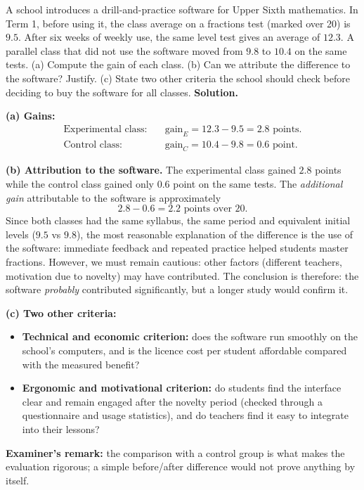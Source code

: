 \documentclass[11pt]{article}
\begin{document}
\begin{exoresolu}
A school introduces a drill-and-practice software for Upper Sixth mathematics. In Term 1, before using it, the class average on a fractions test (marked over 20) is $9.5$. After six weeks of weekly use, the same level test gives an average of $12.3$. A parallel class that did not use the software moved from $9.8$ to $10.4$ on the same tests. (a) Compute the gain of each class. (b) Can we attribute the difference to the software? Justify. (c) State two other criteria the school should check before deciding to buy the software for all classes.
\tcblower
\textbf{Solution.}

\textbf{(a) Gains:}
\begin{align*}
\text{Experimental class:}\quad & \text{gain}_E = 12.3 - 9.5 = 2.8 \text{ points.}\\
\text{Control class:}\quad & \text{gain}_C = 10.4 - 9.8 = 0.6 \text{ point.}
\end{align*}

\textbf{(b) Attribution to the software.} The experimental class gained $2.8$ points while the control class gained only $0.6$ point on the same tests. The \emph{additional gain} attributable to the software is approximately
\[ 2.8 - 0.6 = 2.2 \text{ points over 20.} \]
Since both classes had the same syllabus, the same period and equivalent initial levels ($9.5$ vs $9.8$), the most reasonable explanation of the difference is the use of the software: immediate feedback and repeated practice helped students master fractions. However, we must remain cautious: other factors (different teachers, motivation due to novelty) may have contributed. The conclusion is therefore: the software \emph{probably} contributed significantly, but a longer study would confirm it.

\textbf{(c) Two other criteria:}
\begin{itemize}
\item \textbf{Technical and economic criterion:} does the software run smoothly on the school's computers, and is the licence cost per student affordable compared with the measured benefit?
\item \textbf{Ergonomic and motivational criterion:} do students find the interface clear and remain engaged after the novelty period (checked through a questionnaire and usage statistics), and do teachers find it easy to integrate into their lessons?
\end{itemize}
\textbf{Examiner's remark:} the comparison with a control group is what makes the evaluation rigorous; a simple before/after difference would not prove anything by itself.
\end{exoresolu}
\end{document}

